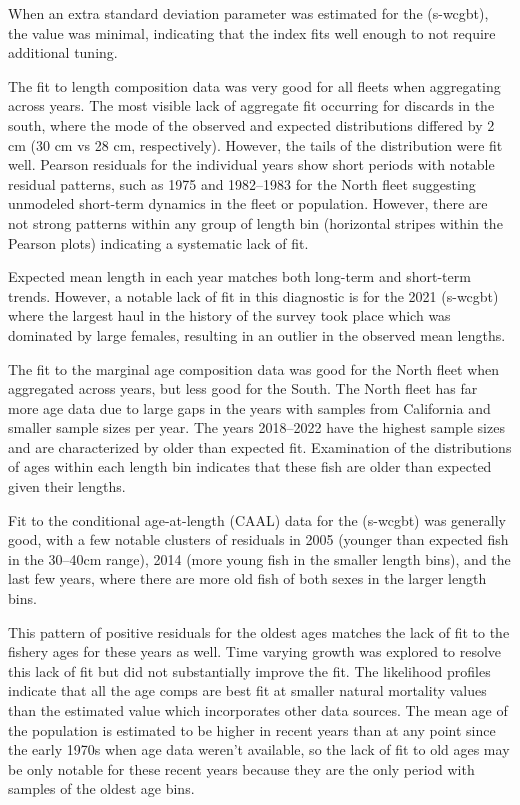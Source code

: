 \documentclass[
]{scrartcl}
\begin{document}
When an extra standard deviation parameter was estimated for the
(\textsf{s-wcgbt}), the value was minimal, indicating that the index fits well
enough to not require additional tuning.

The fit to length composition data was very good for all fleets when
aggregating across years. The most visible lack of aggregate fit
occurring for discards in the south, where the mode of the observed and
expected distributions differed by 2 cm (30 cm vs 28 cm, respectively).
However, the tails of the distribution were fit well. Pearson residuals
for the individual years show short periods with notable residual
patterns, such as 1975 and 1982--1983 for the North fleet suggesting
unmodeled short-term dynamics in the fleet or population. However, there
are not strong patterns within any group of length bin (horizontal
stripes within the Pearson plots) indicating a systematic lack of fit.

Expected mean length in each year matches both long-term and short-term
trends. However, a notable lack of fit in this diagnostic is for the
2021 (\textsf{s-wcgbt}) where the largest haul in the history of the survey took
place which was dominated by large females, resulting in an outlier in
the observed mean lengths.

The fit to the marginal age composition data was good for the North
fleet when aggregated across years, but less good for the South. The
North fleet has far more age data due to large gaps in the years with
samples from California and smaller sample sizes per year. The years
2018--2022 have the highest sample sizes and are characterized by older
than expected fit. Examination of the distributions of ages within each
length bin indicates that these fish are older than expected given their
lengths.

Fit to the conditional age-at-length (CAAL) data for the (s-wcgbt) was
generally good, with a few notable clusters of residuals in 2005
(younger than expected fish in the 30--40cm range), 2014 (more young
fish in the smaller length bins), and the last few years, where there
are more old fish of both sexes in the larger length bins.

This pattern of positive residuals for the oldest ages matches the lack
of fit to the fishery ages for these years as well. Time varying growth
was explored to resolve this lack of fit but did not substantially
improve the fit. The likelihood profiles indicate that all the age comps
are best fit at smaller natural mortality values than the estimated
value which incorporates other data sources. The mean age of the
population is estimated to be higher in recent years than at any point
since the early 1970s when age data weren't available, so the lack of
fit to old ages may be only notable for these recent years because they
are the only period with samples of the oldest age bins.
\end{document}
